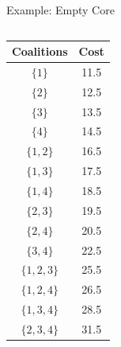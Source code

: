 \documentclass[14pt]{beamer}
\begin{document}
\begin{frame}{Example: Empty Core}
\small
\vspace{-4mm}
\begin{columns}
\begin{column}{4.5cm}
\begin{table}[H]
\centering
\tabcolsep=8pt
\footnotesize
\renewcommand\arraystretch{1.1}
\vspace{-3mm}
\begin{tabular}[!h]{c c }
\hline
\multicolumn{1}{c}{Coalitions} &\multicolumn{1}{c}{Cost}\\
\hline
$\{1\}$		&11.5	\\

$\{2\}$		&12.5	\\

$\{3\}$		&13.5	\\

$\{4\}$		&14.5  \\

$\{1,2\}$		&16.5	\\

$\{1,3\}$		&17.5	\\

$\{1,4\}$		&18.5	\\

$\{2,3\}$		&19.5	\\

$\{2,4\}$		&20.5	\\

$\{3,4\}$		&22.5	\\

$\{1,2,3\}$		&25.5	\\

$\{1,2,4\}$		&26.5	\\

$\{1,3,4\}$		&28.5	\\

$\{2,3,4\}$		&31.5	\\


\end{tabular}
\end{table}
\end{column}
\end{columns}
\end{frame}
\end{document}
